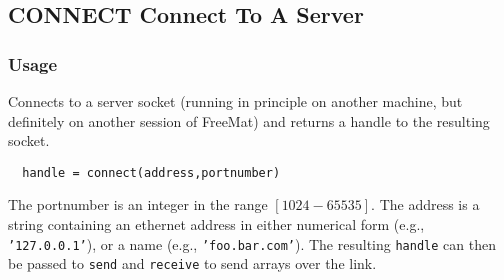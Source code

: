 %
%
%
\subsection{CONNECT Connect To A Server}
\subsubsection{Usage}
Connects to a server socket (running in principle on another 
machine, but definitely on another session of FreeMat) and returns a handle 
to the resulting socket.
\begin{verbatim}
  handle = connect(address,portnumber)
\end{verbatim}
The portnumber is an integer in the range $[1024-65535]$.  The
address is a string containing an ethernet address in either
numerical form (e.g., \texttt{'127.0.0.1'}), or a name (e.g., 
\texttt{'foo.bar.com'}).  The resulting \verb|handle| can then be passed
to \verb|send| and \verb|receive| to send arrays over the link.
